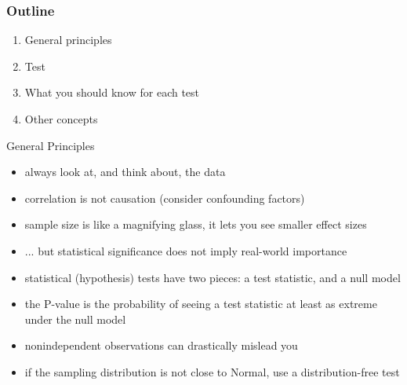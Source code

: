 %
%
%



\date{5 December 2013}




\begin{frame}\frametitle<presentation>{Outline}
  \begin{enumerate}
    \item General principles
    \item Test
    \item What you should know for each test
    \item Other concepts
  \end{enumerate}
\end{frame}


\begin{frame}{General Principles}

  \begin{itemize}
    \item always look at, and think about, the data
    \item correlation is not causation (consider confounding factors)
    \item  sample size is like a magnifying glass, it lets you see smaller effect sizes
    \item  ... but statistical significance does not imply real-world importance
    \item  statistical (hypothesis) tests have two pieces: a test statistic, and a null model
    \item  the P-value is the probability of seeing a test statistic at least as extreme under the null model
    \item  nonindependent observations can drastically mislead you
    \item  if the sampling distribution is not close to Normal, use a distribution-free test
  \end{itemize}


\end{frame}


